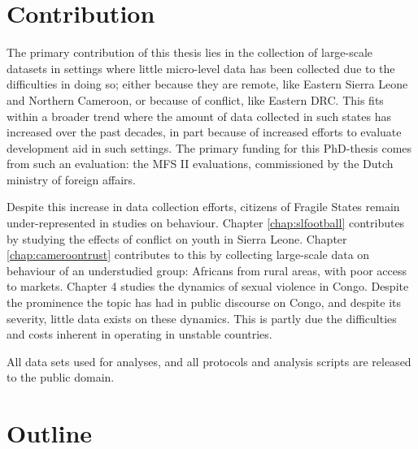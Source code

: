 \section{Contribution}
The primary contribution of this thesis lies in the collection of large-scale datasets in settings where little micro-level data has been collected due to the difficulties in doing so; either because they are remote, like Eastern Sierra Leone and Northern Cameroon, or because of conflict, like Eastern DRC. This fits within a broader trend where the amount of data collected in such states has increased over the past decades, in part because of increased efforts to evaluate development aid in such settings. The primary funding for this PhD-thesis comes from such an evaluation: the MFS II evaluations, commissioned by the Dutch ministry of foreign affairs.

Despite this increase in data collection efforts, citizens of Fragile States remain under-represented in studies on behaviour. Chapter \ref{chap:slfootball} contributes by studying the effects of conflict on youth in Sierra Leone. Chapter \ref{chap:cameroontrust} contributes to this by collecting large-scale data on behaviour of an understudied group: Africans from rural areas, with poor access to markets. Chapter 4 studies the dynamics of sexual violence in Congo. Despite the prominence the topic has had in public discourse on Congo, and despite its severity, little data exists on these dynamics. This is partly due the difficulties and costs inherent in operating in unstable countries.

All data sets used for analyses, and all protocols and analysis scripts are released to the public domain.


\section{Outline}


\clearpage 

